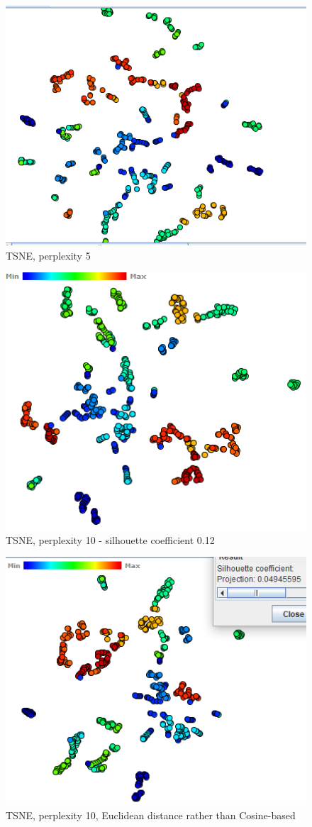 \documentclass[ 10pt ]{fphw}
\begin{document}
\begin{center}
\begin{figure}[H]
    \centering
	\includegraphics[width=0.65\columnwidth]{task2d/medTSNE5.PNG}
	\caption{TSNE, perplexity 5}
	\label{fig:medt5}
	\end{figure}
\end{center}


\begin{center}
\begin{figure}[H]
    \centering
	\includegraphics[width=0.65\columnwidth]{task2d/medTSNE10.PNG}
	\caption{TSNE, perplexity 10 - silhouette coefficient 0.12}
	\label{fig:medt10}
	\end{figure}
\end{center}

\begin{center}
\begin{figure}[H]
    \centering
	\includegraphics[width=0.65\columnwidth]{task2d/medTSNE10-EUC.PNG}
	\caption{TSNE, perplexity 10, Euclidean distance rather than Cosine-based}
	\label{fig:medt10Euc}
	\end{figure}
\end{center}
\end{document}
